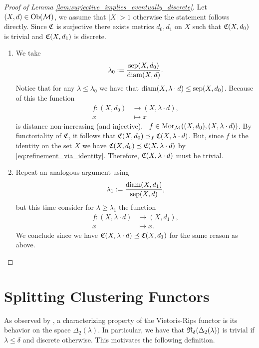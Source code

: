 \begin{proof}[Proof of Lemma \ref{lem:surjective_implies_eventually_discrete}]
    Let $(X,d) \in \mathrm {Ob}(\mathcal{M})$, we assume that $|X| > 1$ otherwise the statement follows directly. Since $\mathfrak{C}$ is surjective there exists metrics $d_0, d_1$ on $X$ such that $\mathfrak{C}(X,d_0)$ is trivial and $\mathfrak{C}(X,d_1)$ is discrete.

    \begin{enumerate}
        \item We take
        $$
        \lambda_0 := \frac{\mathrm{sep}(X,d_0)}{\mathrm{diam}(X,d)}.
        $$ 
        Notice that for any $\lambda \le \lambda_0$ we have that $\mathrm{diam}(X,\lambda \cdot d) \le \mathrm{sep}(X,d_0)$. Because of this the function
        \begin{align*}
            f: (X, d_0) &\longrightarrow (X, \lambda \cdot d),\\
            x &\longmapsto x
        \end{align*}
        is distance non-increasing (and injective), \ie\ $f \in \mathrm {Mor}_{\mathcal{M}}((X,d_0), (X,\lambda \cdot d))$.
        By functoriality of $\mathfrak{C}$, it follows that $\mathfrak{C}(X,d_0) \preceq_f \mathfrak{C}(X,\lambda \cdot d)$. But, since $f$ is the identity on the set $X$ we have $\mathfrak{C}(X,d_0) \preceq \mathfrak{C}(X,\lambda \cdot d)$ by \eqref{eq:refinement_via_identity}. Therefore, $\mathfrak{C}(X,\lambda \cdot d)$ must be trivial.

        \item Repeat an analogous argument using
        $$
        \lambda_1 := \frac{\mathrm{diam}(X,d_1)}{\mathrm{sep}(X,d)},
        $$
        but this time consider for $\lambda \ge \lambda_1$ the function
        \begin{align*}
            f: (X, \lambda \cdot d) &\longrightarrow (X, d_1),\\
            x &\longmapsto x.
        \end{align*}
        We conclude since we have $\mathfrak{C}(X,\lambda \cdot d) \preceq \mathfrak{C}(X,d_1)$ for the same reason as above. 
        
    \end{enumerate}
\end{proof}

\section{Splitting Clustering Functors}

As observed by \cite[Thm.~6.4]{Carlsson2010}, a characterizing property of the Vietoris-Rips functor is its behavior on the space $\Delta_2(\lambda)$. In particular, we have that $\mathfrak{R}_\delta(\Delta_2(\lambda))$ is trivial if $\lambda \le \delta$ and discrete otherwise.
This motivates the following definition.

